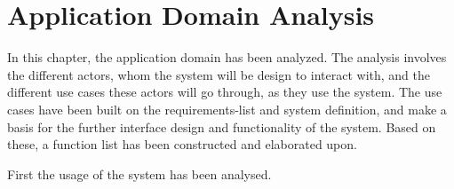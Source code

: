 \chapter{Application Domain Analysis} \label{ch:applicationdomain}
In this chapter, the application domain has been analyzed. The analysis involves the different actors, whom the system will be design to interact with, and the different use cases these actors will go through, as they use the system. The use cases have been built on the requirements-list and system definition, and make a basis for the further interface design and functionality of the system. Based on these, a function list has been constructed and elaborated upon.
\par
First the usage of the system has been analysed.